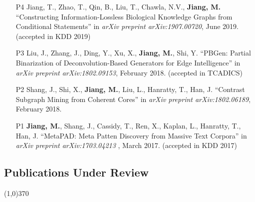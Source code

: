 \documentclass[10pt]{article}
\newenvironment{myindentpar}[1]%
{\begin{list}{}%
         {\setlength{\leftmargin}{#1}}%
         \item[]%
}
{\end{list}}
\newcounter{list}
\begin{document}
\begin{myindentpar}{0.00cm}
\begin{enumerate}[leftmargin=.5cm]
\item[P4] Jiang, T., Zhao, T., Qin, B., Liu, T., Chawla, N.V., \textbf{Jiang, M.} ``Constructing Information-Lossless Biological Knowledge Graphs from Conditional Statements'' in \textit{arXiv preprint arXiv:1907.00720}, June 2019. (accepted in KDD 2019)
		
\item[P3] Liu, J., Zhang, J., Ding, Y., Xu, X., \textbf{Jiang, M.}, Shi, Y. ``PBGen: Partial Binarization of Deconvolution-Based Generators for Edge Intelligence'' in \textit{arXiv preprint arXiv:1802.09153}, February 2018. (accepted in TCADICS)
		
\item[P2] Shang, J., Shi, X., \textbf{Jiang, M.}, Liu, L., Hanratty, T., Han, J. ``Contrast Subgraph Mining from Coherent Cores'' in \textit{arXiv preprint arXiv:1802.06189}, February 2018.

\item[P1] \textbf{Jiang, M.}, Shang, J., Cassidy, T., Ren, X., Kaplan, L., Hanratty, T., Han, J. ``MetaPAD: Meta Patten Discovery from Massive Text Corpora'' in \textit{arXiv preprint arXiv:1703.04213 }, March 2017. (accepted in KDD 2017)

\end{enumerate}

\end{myindentpar}

\subsection{\sc Publications Under Review}
\vspace{-0.4cm} \line(1,0){370} \vspace{-0.1cm}
\end{document}
